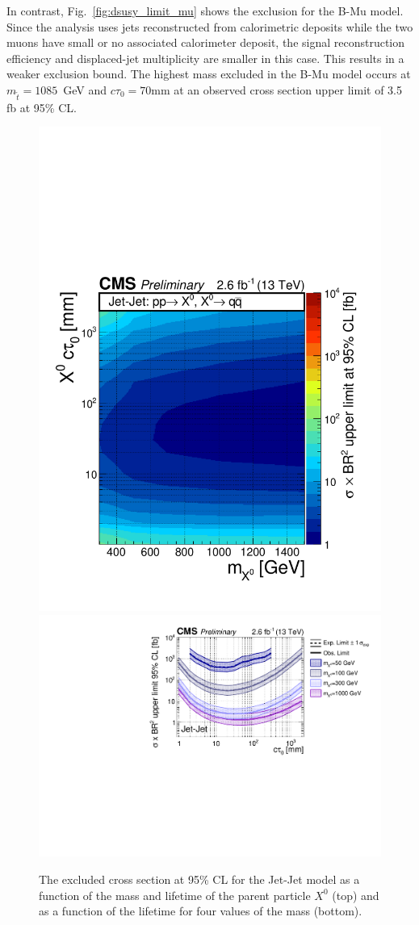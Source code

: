 In contrast, Fig.~\ref{fig:dsusy_limit_mu} shows the exclusion for the
B-Mu model. Since the analysis uses jets reconstructed from
calorimetric deposits while the two muons have small or no associated
calorimeter deposit, the signal reconstruction efficiency and
displaced-jet multiplicity are smaller in this case. This results in a
weaker exclusion bound.  The highest mass excluded in the B-Mu model
occurs at $m_{\tilde{t}}=1085$~GeV and $c\tau_0=70$mm at an
observed cross section upper limit of 3.5 fb at 95\% CL.

\begin{figure}[tb]
\begin{center}

\includegraphics[width=.75\textwidth]{figures/pas//RESULT/UNBLINDED_LIMITS/Jet-Jet2D.pdf}
\includegraphics[width=.85\textwidth]{figures/pas//RESULT/UNBLINDED_LIMITS/Jet-Jet.pdf}
\caption{The excluded cross section at 95\% CL for the Jet-Jet model
  as a function of the mass and lifetime of the parent particle $X^0$
  (top) and as a function of the lifetime for four values of the mass
  (bottom).\label{fig:xx4j_limit}}
\end{center}
\end{figure}

